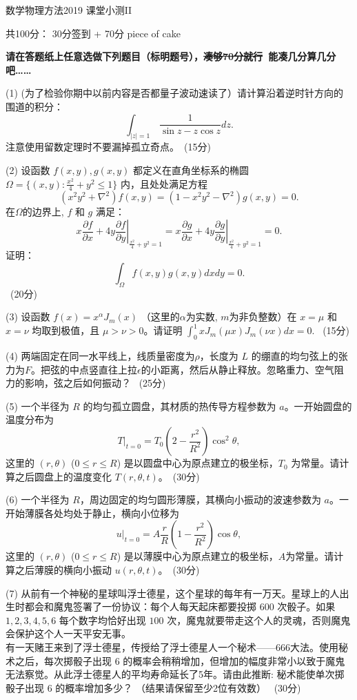 \documentclass[12pt,CJK]{article}
\def\mark#1{{\ \color{blue}(#1分)}}
\begin{document}
\bch
\begin{center}
数学物理方法2019 课堂小测II

{\vskip 0.1in}

  共100分： 30分签到 + 70分 piece of cake 

\end{center}
{\vskip 0.1in}

{\bf 请在答题纸上任意选做下列题目（标明题号），\sout{凑够70分就行}\ 能凑几分算几分吧……}

{\vskip 0.1in}

\bitem
\item[(1)]{(为了检验你期中以前内容是否都量子波动速读了）请计算沿着逆时针方向的围道的积分：
    $$\int_{|z|=1}\, \frac{1}{\sin z - z\cos z} dz.$$
  注意使用留数定理时不要漏掉孤立奇点。\mark{15}}
\item[(2)]{设函数 $f(x,y), g(x,y)$ 都定义在直角坐标系的椭圆 $\Omega = \{(x,y): \frac{x^2}{4}+y^2\le 1\} $ 内，且处处满足方程
    $$  (x^2y^2 + \nabla^2)f(x,y) = (1-x^2y^2-\nabla^2)g(x,y)  = 0.$$
    在$\Omega$的边界上, $f$ 和 $g$ 满足：
    $$\left.x\frac{\partial f}{\partial x}+4y\frac{\partial f}{\partial y}\right\vert_{\frac{x^2}{4}+y^2=1} =  \left.x\frac{\partial g}{\partial x}+4y\frac{\partial g}{\partial y}\right\vert_{\frac{x^2}{4}+y^2=1} = 0.$$
    证明： $$\int_\Omega f(x,y)g(x,y) dx dy = 0.$$ \mark{20}
  }  
\item[(3)]{设函数 $f(x) = x^\alpha J_m(x)$ （这里的$\alpha$为实数, $m$为非负整数）在 $x=\mu$ 和 $x=\nu$ 均取到极值，且 $\mu>\nu>0$。请证明 $\int_0^1 x J_m(\mu x)J_m(\nu x) dx  = 0.$ \mark{15}}
\item[(4)]{两端固定在同一水平线上，线质量密度为$\rho$，长度为 $L$ 的绷直的均匀弦上的张力为$F$。把弦的中点竖直往上拉$\epsilon$的小距离，然后从静止释放。忽略重力、空气阻力的影响，弦之后如何振动？ \mark{25}}
\item[(5)]{一个半径为 $R$ 的均匀孤立圆盘，其材质的热传导方程参数为 $a$。一开始圆盘的温度分布为 $$\left.T\right\vert_{t=0} = T_0\left(2-\frac{r^2}{R^2}\right)\cos^2\theta,$$这里的 $(r,\theta)$ ($0\le r\le R$) 是以圆盘中心为原点建立的极坐标，$T_0$ 为常量。请计算之后圆盘上的温度变化 $T(r,\theta, t)$。\mark{30}}
\item[(6)]{一个半径为 $R$，周边固定的均匀圆形薄膜，其横向小振动的波速参数为 $a$。一开始薄膜各处均处于静止，横向小位移为 $$\left.u\right\vert_{t=0} = A\frac{r}{R}\left(1-\frac{r^2}{R^2}\right)\cos\theta,$$这里的 $(r,\theta)$ ($0\le r\le R$) 是以薄膜中心为原点建立的极坐标，$A$为常量。请计算之后薄膜的横向小振动 $u(r,\theta, t)$。\mark{30}}
\item[(7)]{从前有一个神秘的星球叫浮士德星，这个星球的每年有一万天。星球上的人出生时都会和魔鬼签署了一份协议：每个人每天起床都要投掷 $600$ 次骰子。如果 $1,2,3,4,5,6$ 每个数字均恰好出现 $100$ 次，魔鬼就要带走这个人的灵魂，否则魔鬼会保护这个人一天平安无事。\\
    有一天赌王来到了浮士德星，传授给了浮士德星人一个秘术——666大法。使用秘术之后，每次掷骰子出现 $6$ 的概率会稍稍增加，但增加的幅度非常小以致于魔鬼无法察觉。从此浮士德星人的平均寿命延长了5年。请由此推断: 秘术能使单次掷骰子出现 $6$ 的概率增加多少？ （结果请保留至少2位有效数） \mark{30}}
\end{document}
